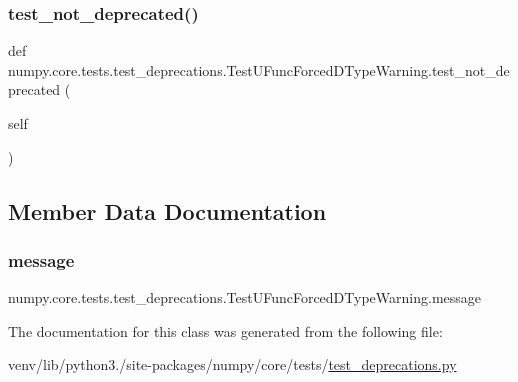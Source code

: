\subsubsection{\texorpdfstring{test\+\_\+not\+\_\+deprecated()}{test\_not\_deprecated()}}
{\footnotesize\ttfamily def numpy.\+core.\+tests.\+test\+\_\+deprecations.\+Test\+U\+Func\+Forced\+D\+Type\+Warning.\+test\+\_\+not\+\_\+deprecated (\begin{DoxyParamCaption}\item[{}]{self }\end{DoxyParamCaption})}



\subsection{Member Data Documentation}
\mbox{\label{classnumpy_1_1core_1_1tests_1_1test__deprecations_1_1TestUFuncForcedDTypeWarning_a72c0eca9606f8e5b8add874a7ea2bf96}} 
\subsubsection{\texorpdfstring{message}{message}}
{\footnotesize\ttfamily numpy.\+core.\+tests.\+test\+\_\+deprecations.\+Test\+U\+Func\+Forced\+D\+Type\+Warning.\+message\hspace{0.3cm}{\ttfamily [static]}}



The documentation for this class was generated from the following file\+:\begin{DoxyCompactItemize}
\item 
venv/lib/python3./site-\/packages/numpy/core/tests/\hyperlink{core_2tests_2test__deprecations_8py}{test\+\_\+deprecations.\+py}\end{DoxyCompactItemize}
